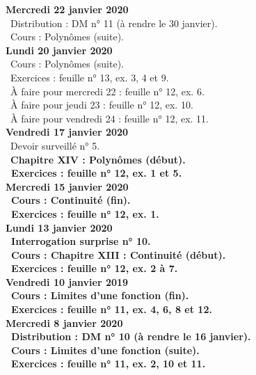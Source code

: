 \documentclass[12pt,a4paper]{article}
\begin{document}
\noindent\textbf{Mercredi 22 janvier 2020} \\
\bu\ Distribution : DM n° 11 (à rendre le 30 janvier).\\
\bu\ Cours : Polynômes (suite).\vspace{.4cm}\\
  
\noindent\textbf{Lundi 20 janvier 2020} \\
\bu\ Cours : Polynômes (suite).\\
\bu\ Exercices : feuille n° 13, ex. 3, 4 et 9.\\
\bu\ À faire pour mercredi 22 : feuille n° 12, ex. 6.\\
\bu\ À faire pour jeudi 23 : feuille n° 12, ex. 10.\\
\bu\ À faire pour vendredi 24 : feuille n° 12, ex. 11.\vspace{.4cm}\\ 
 
\noindent\textbf{Vendredi 17 janvier 2020}\\
\bu\ Devoir surveillé n° 5.\\
\bu\ \bf Chapitre XIV \rm : Polynômes (début).\\
\bu\ Exercices : feuille n° 12, ex. 1 et 5.\vspace{.4cm}\\

\noindent\textbf{Mercredi 15 janvier 2020}\\
\bu\ Cours : Continuité (fin).\\
\bu\ Exercices : feuille n° 12, ex. 1.\vspace{.4cm}\\

\textbf{Lundi 13 janvier 2020} \\
\bu\ Interrogation surprise n° 10.\\
\noindent\bu\ Cours : \bf Chapitre XIII \rm : Continuité (début).\\
\bu\ Exercices : feuille n° 12, ex. 2 à 7.\vspace{.4cm}\\

\noindent\textbf{Vendredi 10 janvier 2019}\\
\bu\ Cours : Limites d'une fonction (fin).\\
\bu\ Exercices : feuille n° 11, ex. 4, 6, 8 et 12.\vspace{.4cm}\\

\noindent\textbf{Mercredi 8 janvier 2020} \\
\bu\ Distribution : DM n° 10 (à rendre le 16 janvier).\\
\bu\ Cours : Limites d'une fonction (suite).\\
\bu\ Exercices : feuille n° 11, ex. 2, 10 et 11.\vspace{.4cm}\\
\end{document}
